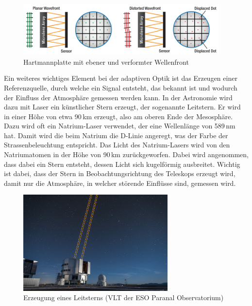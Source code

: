 \begin{refsection}
\begin{figure}
  \centering
  \includegraphics[width=0.95\textwidth]{adaptiv/images/hartmannplatte}
  \caption{Hartmannplatte mit ebener und verformter Wellenfront
    \cite{thor:hartmannplatte}}
  \label{fig:hartmannplatte}
\end{figure}

Ein weiteres wichtiges Element bei der adaptiven Optik ist das Erzeugen
einer Referenzquelle, durch welche ein Signal entsteht, das bekannt
ist und wodurch der Einfluss der Atmosphäre gemessen werden kann. In
der Astronomie wird dazu mit Laser ein künstlicher Stern erzeugt, der
sogenannte Leitstern. Er wird in einer Höhe von etwa 90\,km erzeugt, also
am oberen Ende der Mesosphäre. Dazu wird oft ein Natrium-Laser verwendet,
der eine Wellenlänge von 589\,nm hat. Damit wird die beim Natrium die
D-Linie angeregt, was der Farbe der Strassenbeleuchtung entspricht. Das
Licht des Natrium-Lasers wird von den Natriumatomen in der Höhe von
90\,km zurückgeworfen. Dabei wird angenommen, dass dabei ein Stern
entsteht, dessen Licht sich kugelförmig ausbreitet. Wichtig ist dabei,
dass der Stern in Beobachtungsrichtung des Teleskops erzeugt wird, damit
nur die Atmosphäre, in welcher störende Einflüsse sind, gemessen wird.
%
%

\begin{figure}
  \centering
  \includegraphics[width=0.7\textwidth]{adaptiv/images/Leitstern}
  \caption{Erzeugung eines Leitsterns (VLT der ESO Paranal Observatorium)
    \cite{eso:leitstern}}
  \label{fig:leitstern}
\end{figure}


\end{refsection}
